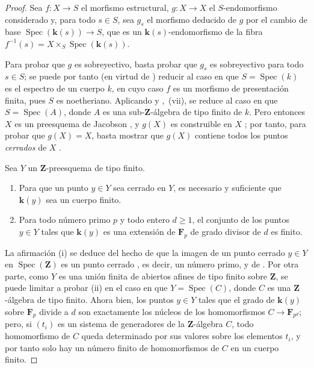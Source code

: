 \begin{proof}
Sea $f:X\to S$ el morfismo estructural, $g:X\to X$ el $S$-endomorfismo considerado y, para todo $s\in S$, sea $g_s$ el morfismo deducido de $g$ por el cambio de base $\operatorname{Spec}(\boldsymbol{k}(s))\to S$, que es un $\boldsymbol{k}(s)$-endomorfismo de la fibra $f^{-1}(s)=X\times_S\operatorname{Spec}(\boldsymbol{k}(s))$.

Para probar que $g$ es sobreyectivo, basta probar que $g_s$ es sobreyectivo para todo $s\in S$; se puede por tanto (en virtud de ) reducir al caso en que $S=\operatorname{Spec}(k)$ es el espectro de un cuerpo $k$, en cuyo caso $f$ es un morfismo de presentación finita, pues $S$ es noetheriano.
Aplicando  y ,~(vii), se reduce al caso en que $S=\operatorname{Spec}(A)$, donde $A$ es una sub-$\mathbf Z$-álgebra de tipo finito de $k$.
Pero entonces $X$ es un preesquema de Jacobson , y $g(X)$ es construible en $X$ ; por tanto, para probar que $g(X)=X$, basta mostrar que $g(X)$ contiene todos los puntos \emph{cerrados} de $X$ .

\begin{lemma}[10.4.11.1]
\label{IV.10.4.11.1}
Sea $Y$ un $\mathbf Z$-preesquema de tipo finito.
\begin{enumerate}[label=\textup{(\roman*)}]
  \item Para que un punto $y\in Y$ sea cerrado en $Y$, es necesario y suficiente que $\boldsymbol{k}(y)$ sea un cuerpo finito.
  \item Para todo número primo $p$ y todo entero $d\geq1$, el conjunto de los puntos $y\in Y$ tales que $\boldsymbol{k}(y)$ es una extensión de $\mathbf F_p$ de grado divisor de $d$ es finito.
\end{enumerate}
\end{lemma}

La afirmación (i) se deduce del hecho de que la imagen de un punto cerrado $y\in Y$ en $\operatorname{Spec}(\mathbf Z)$ es un punto cerrado , es decir, un número primo, y de .
Por otra parte, como $Y$ es una unión finita de abiertos afines de tipo finito sobre $\mathbf Z$, se puede limitar a probar (ii) en el caso en que $Y=\operatorname{Spec}(C)$, donde $C$ es una $\mathbf Z$-álgebra de tipo finito.
Ahora bien, los puntos $y\in Y$ tales que el grado de $\boldsymbol{k}(y)$ sobre $\mathbf F_p$ divide a $d$ son exactamente los núcleos de los homomorfismos $C\to\mathbf F_{p^d}$; pero, si $(t_i)$ es un sistema de generadores de la $\mathbf Z$-álgebra $C$, todo homomorfismo de $C$ queda determinado por sus valores sobre los elementos $t_i$, y por tanto solo hay un número finito de homomorfismos de $C$ en un cuerpo finito.


\end{proof}
